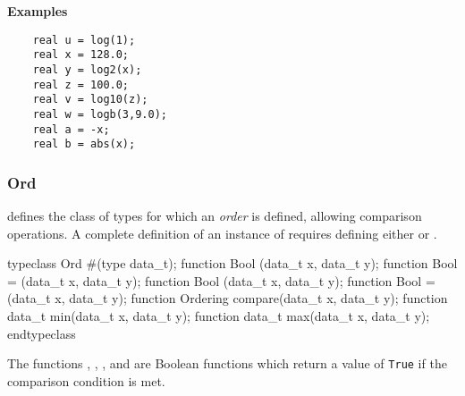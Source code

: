 {\bf Examples}

\begin{verbatim}
    real u = log(1);
    real x = 128.0;
    real y = log2(x);
    real z = 100.0;
    real v = log10(z);
    real w = logb(3,9.0);
    real a = -x;
    real b = abs(x);
\end{verbatim}


\subsubsection{Ord}
\label{sec-ord}

 defines the class of types for which an \emph{order} is
defined,  allowing comparison operations.  A complete  definition of an
instance of   requires defining  either \te{<=}
or . 




\begin{libverbatim}
   typeclass Ord #(type data_t);
       function Bool \<  (data_t x, data_t y);
       function Bool \<= (data_t x, data_t y);
       function Bool \>  (data_t x, data_t y);
       function Bool \>= (data_t x, data_t y);
       function Ordering compare(data_t x, data_t y); 
       function data_t min(data_t x, data_t y);
       function data_t max(data_t x, data_t y);
   endtypeclass
\end{libverbatim}


The functions \te{<}, \te{<=}, \te{>}, and \te{>=} are Boolean functions which return a
value of {\tt True} if the comparison condition is met.  

